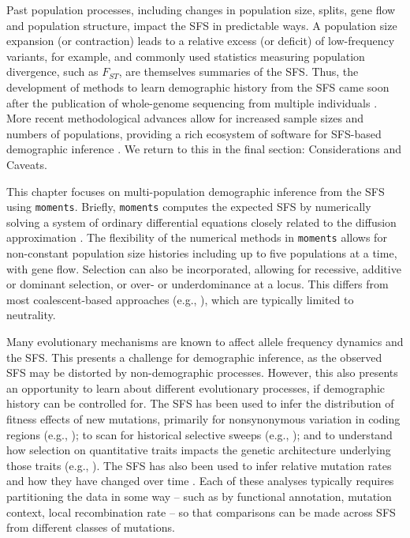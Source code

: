 \documentclass[]{article}
\newcommand{\moments}{\texttt{moments}\xspace}
\begin{document}
Past population processes, including changes in population size, splits, gene flow
and population structure, impact the SFS in predictable ways. A population size
expansion (or contraction) leads to a relative excess (or deficit) of
low-frequency variants, for example, and commonly used statistics measuring
population divergence, such as $F_{ST}$, are themselves summaries of the SFS.
Thus, the development of methods to learn demographic history from the SFS came
soon after the publication of whole-genome sequencing from multiple individuals
\cite{marth2004allele, williamson2005simultaneous}. More recent methodological
advances allow for increased sample sizes and numbers of populations, providing
a rich ecosystem of software for SFS-based demographic inference
\cite{gutenkunst2009inferring, excoffier2011fastsimcoal,
    gravel2011demographic, jouganous2017inferring, ragsdale2018genomic,
kamm2020efficiently, dilber2024faster}. We return to this in the final section:
Considerations and Caveats.

This chapter focuses on multi-population demographic inference from the SFS
using \moments \cite{jouganous2017inferring}. Briefly, \moments computes the
expected SFS by numerically solving a system of ordinary differential equations
closely related to the diffusion approximation \cite{gutenkunst2009inferring}.
The flexibility of the numerical methods in \moments allows for non-constant
population size histories including up to five populations at a time, with gene
flow. Selection can also be incorporated, allowing for recessive, additive or
dominant selection, or over- or underdominance at a locus. This differs from
most coalescent-based approaches (e.g.,
\cite{excoffier2011fastsimcoal,dewitt2021nonparametric,dilber2024faster}),
which are typically limited to neutrality.

Many evolutionary mechanisms are known to affect allele frequency dynamics and
the SFS. This presents a challenge for demographic inference, as the observed
SFS may be distorted by non-demographic processes. However, this also presents
an opportunity to learn about different evolutionary processes, if demographic
history can be controlled for. The SFS has been used to infer the distribution
of fitness effects of new mutations, primarily for nonsynonymous variation in
coding regions (e.g., \cite{eyre2006distribution, boyko2008assessing,
kim2017inference}); to scan for historical selective sweeps (e.g.,
\cite{kim2002detecting, nielsen2005genomic}); and to understand how selection
on quantitative traits impacts the genetic architecture underlying those traits
(e.g., \cite{patel2024conditional, ragsdale2024archaic}). The SFS has also been
used to infer relative mutation rates and how they have changed over time
\cite{dewitt2021nonparametric}. Each of these analyses typically requires
partitioning the data in some way -- such as by functional annotation, mutation
context, local recombination rate -- so that comparisons can be made across SFS
from different classes of mutations.
\end{document}
